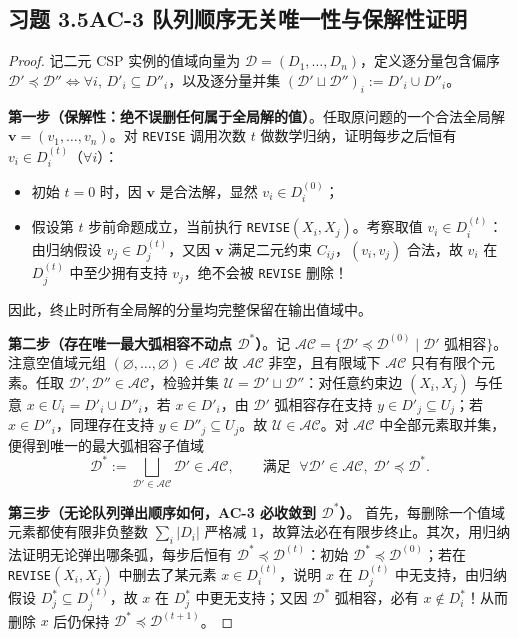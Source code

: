 \subsection*{习题 3.5\quad AC-3 队列顺序无关唯一性与保解性证明}
\begin{proof}
记二元 CSP 实例的值域向量为 $\mathcal{D} = (D_1, \dots, D_n)$，定义逐分量包含偏序 $\mathcal{D}' \preceq \mathcal{D}'' \iff \forall i,\, D'_i \subseteq D''_i$，以及逐分量并集 $(\mathcal{D}' \sqcup \mathcal{D}'')_i := D'_i \cup D''_i$。

\textbf{第一步（保解性：绝不误删任何属于全局解的值）}。任取原问题的一个合法全局解 $\mathbf{v} = (v_1, \dots, v_n)$。对 \texttt{REVISE} 调用次数 $t$ 做数学归纳，证明每步之后恒有 $v_i \in D_i^{(t)}$（$\forall i$）：
\begin{itemize}
  \item 初始 $t=0$ 时，因 $\mathbf{v}$ 是合法解，显然 $v_i \in D_i^{(0)}$；
  \item 假设第 $t$ 步前命题成立，当前执行 \texttt{REVISE}$(X_i, X_j)$。考察取值 $v_i \in D_i^{(t)}$：由归纳假设 $v_j \in D_j^{(t)}$，又因 $\mathbf{v}$ 满足二元约束 $C_{ij}$，$(v_i, v_j)$ 合法，故 $v_i$ 在 $D_j^{(t)}$ 中至少拥有支持 $v_j$，绝不会被 \texttt{REVISE} 删除！
\end{itemize}
因此，终止时所有全局解的分量均完整保留在输出值域中。

\textbf{第二步（存在唯一最大弧相容不动点 $\mathcal{D}^*$）}。记 $\mathcal{AC} = \{\mathcal{D}' \preceq \mathcal{D}^{(0)} \mid \mathcal{D}' \text{ 弧相容}\}$。注意空值域元组 $(\varnothing,\dots,\varnothing) \in \mathcal{AC}$ 故 $\mathcal{AC}$ 非空，且有限域下 $\mathcal{AC}$ 只有有限个元素。任取 $\mathcal{D}', \mathcal{D}'' \in \mathcal{AC}$，检验并集 $\mathcal{U} = \mathcal{D}' \sqcup \mathcal{D}''$：对任意约束边 $(X_i, X_j)$ 与任意 $x \in U_i = D'_i \cup D''_i$，若 $x \in D'_i$，由 $\mathcal{D}'$ 弧相容存在支持 $y \in D'_j \subseteq U_j$；若 $x \in D''_i$，同理存在支持 $y \in D''_j \subseteq U_j$。故 $\mathcal{U} \in \mathcal{AC}$。对 $\mathcal{AC}$ 中全部元素取并集，便得到唯一的最大弧相容子值域
\[
  \mathcal{D}^* := \bigsqcup_{\mathcal{D}' \in \mathcal{AC}} \mathcal{D}' \in \mathcal{AC}, \qquad \text{满足 }\; \forall \mathcal{D}' \in \mathcal{AC},\; \mathcal{D}' \preceq \mathcal{D}^*.
\]

\textbf{第三步（无论队列弹出顺序如何，AC-3 必收敛到 $\mathcal{D}^*$）}。
首先，每删除一个值域元素都使有限非负整数 $\sum_i |D_i|$ 严格减 $1$，故算法必在有限步终止。其次，用归纳法证明无论弹出哪条弧，每步后恒有 $\mathcal{D}^* \preceq \mathcal{D}^{(t)}$：初始 $\mathcal{D}^* \preceq \mathcal{D}^{(0)}$；若在 \texttt{REVISE}$(X_i, X_j)$ 中删去了某元素 $x \in D_i^{(t)}$，说明 $x$ 在 $D_j^{(t)}$ 中无支持，由归纳假设 $D_j^* \subseteq D_j^{(t)}$，故 $x$ 在 $D_j^*$ 中更无支持；又因 $\mathcal{D}^*$ 弧相容，必有 $x \notin D_i^*$！从而删除 $x$ 后仍保持 $\mathcal{D}^* \preceq \mathcal{D}^{(t+1)}$。


\end{proof}
